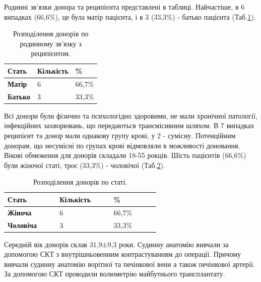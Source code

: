 Родинні зв'язки донора та реципієнта представлені в таблиці. Найчастіше, в 6 випадках (66,6\%), це була матір пацієнта, і в 3 (33,3\%) - батько пацієнта (Таб.\ref{tab:donorrec}). 

\begin{table}[]
\centering
\caption{Розподілення донорів по родинному зв'язку з реципієнтом.}
\label{tab:donorrec}
\begin{tabular}{|l|l|l|}
\hline
\textbf{Стать}  & {\color[HTML]{231F20} \textbf{Кількість}} & {\color[HTML]{231F20} \textbf{\%}} \\ \hline
\textbf{Матір}  & 6                                         & 66,7\%                             \\ \hline
\textbf{Батько} & 3                                         & 33,3\%                             \\ \hline
\end{tabular}
\end{table}

Всі донори були фізично та психологідно здоровими, не мали хронічної патології, інфекційних захворювань, що передаються трансмісивним шляхом. В 7 випадках реципієнт та донор мали однакову групу крові, у 2 - сумісну. Потенційним донорам, що несумісні по групах крові відмовляли в можливості доновання. Вікові обмеження для донорів складали 18-55 рокців. 
Шість пацієнтів (66,6\%) були жіночої статі, троє (33,3\%) - чоловічої (Таб.\ref{tab:donorsex}).


\begin{table}[]
\centering
\caption{Розподілення донорів по статі.}
\label{tab:donorsex}
\begin{tabular}{|p{0.2\linewidth}|
                 p{0.2\linewidth}|
                 p{0.2\linewidth}|}
\hline
\textbf{Стать}    &  \textbf{Кількість} & \textbf{\%} \\ \hline
\textbf{Жіноча}   & 6                                         & 66,7\%                             \\ \hline
\textbf{Чоловіча} & 3                                         & 33,3\%                             \\ \hline
\end{tabular}
\end{table}

Середній вік донорів склав 31,9±9,3 роки. 
Судинну анатомію вивчали за допомогою СКТ з внутрішньовенним контрастуванням до операції. Причому вивчали судинну анатомію ворітної та печінкової вени а також печінкової артерії. 
За допомогою СКТ проводили волюметрію майбутнього трансплантату. 

